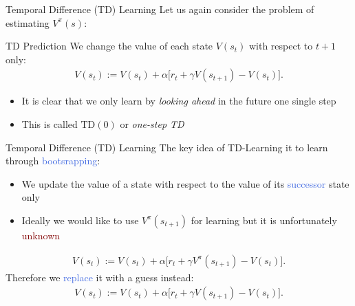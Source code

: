 \documentclass{beamer}
\begin{document}
\begin{frame}{Temporal Difference (TD) Learning}
	Let us again consider the problem of estimating $V^{\pi}(s)$:
	\begin{block}{TD Prediction}
		We change the value of each state $V(s_t)$ with respect to $t+1$ only:
		\begin{align*}
			V(s_t):= V(s_t) + \alpha \big[r_t + \gamma V(s_{t+1}) - V(s_t)\big].
		\end{align*}
	\end{block}
	
	\begin{itemize}
		\item It is clear that we only learn by \textit{looking ahead} in the future one single step
		\item This is called $\text{TD}(0)$ or \textit{one-step TD}
	\end{itemize}

\end{frame}


\begin{frame}{Temporal Difference (TD) Learning}
	The key idea of TD-Learning it to learn through \textcolor{RoyalBlue}{bootsrapping}:
	\begin{itemize}
		\item We update the value of a state with respect to the value of its \textcolor{RoyalBlue}{successor} state only
		\item Ideally we would like to use $V^{\pi}(s_{t+1})$ for learning but it is unfortunately \textcolor{Maroon}{unknown}
	\end{itemize}	
	\begin{align*}
		V(s_t):= V(s_t) + \alpha \big[r_t + \gamma V^{\pi}(s_{t+1}) - V(s_t)\big].
	\end{align*}
	Therefore we \textcolor{RoyalBlue}{replace} it with a guess instead:
	\begin{align*}
		V(s_t):= V(s_t) + \alpha \big[r_t + \gamma V(s_{t+1}) - V(s_t)\big].
	\end{align*}
	
\end{frame}
\end{document}
